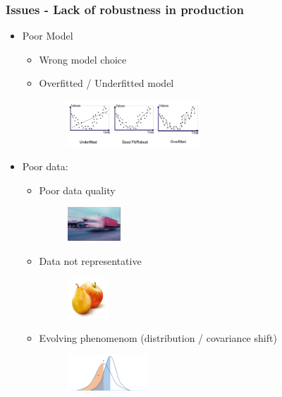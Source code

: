 \begin{frame}\frametitle{Issues - Lack of robustness in production}
   \begin{itemize}
      \item Poor Model
      \begin{itemize}
         \item Wrong model choice
         \item Overfitted / Underfitted model
         \begin{figure}[H]
            \includegraphics[width=5cm]{../images/illustrations/model_fit.png}
         \end{figure}
      \end{itemize}
      \item Poor data:
      \begin{itemize}
         \item Poor data quality
         \begin{minipage}{0.2\linewidth}
            \begin{figure}[H]
               \includegraphics[width=2cm]{../images/illustrations/blurry.png}
            \end{figure}
         \end{minipage}
         \item Data not representative
         \begin{minipage}{0.2\linewidth}
            \begin{figure}[H]
               \includegraphics[width=1.5cm]{../images/illustrations/pomme_poire.png}
            \end{figure}
         \end{minipage}
         \item Evolving phenomenom (distribution / covariance shift)
         \begin{minipage}{0.2\linewidth}
            \begin{figure}[H]
               \includegraphics[width=3cm]{../images/illustrations/distribution_shift.png}
            \end{figure}
         \end{minipage}
      \end{itemize}
   \end{itemize}   
\end{frame}

